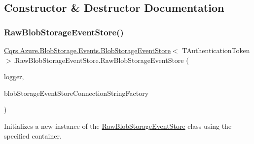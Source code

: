 \subsection{Constructor \& Destructor Documentation}
\mbox{\label{classCqrs_1_1Azure_1_1BlobStorage_1_1Events_1_1BlobStorageEventStore_1_1RawBlobStorageEventStore_a42832e52a20eeb7012526624181f457c_a42832e52a20eeb7012526624181f457c}} 
\subsubsection{\texorpdfstring{Raw\+Blob\+Storage\+Event\+Store()}{RawBlobStorageEventStore()}}
{\footnotesize\ttfamily \hyperlink{classCqrs_1_1Azure_1_1BlobStorage_1_1Events_1_1BlobStorageEventStore}{Cqrs.\+Azure.\+Blob\+Storage.\+Events.\+Blob\+Storage\+Event\+Store}$<$ T\+Authentication\+Token $>$.Raw\+Blob\+Storage\+Event\+Store.\+Raw\+Blob\+Storage\+Event\+Store (\begin{DoxyParamCaption}\item[{I\+Logger}]{logger,  }\item[{\hyperlink{interfaceCqrs_1_1Azure_1_1BlobStorage_1_1IBlobStorageStoreConnectionStringFactory}{I\+Blob\+Storage\+Store\+Connection\+String\+Factory}}]{blob\+Storage\+Event\+Store\+Connection\+String\+Factory }\end{DoxyParamCaption})}



Initializes a new instance of the \hyperlink{classCqrs_1_1Azure_1_1BlobStorage_1_1Events_1_1BlobStorageEventStore_1_1RawBlobStorageEventStore}{Raw\+Blob\+Storage\+Event\+Store} class using the specified container. 



